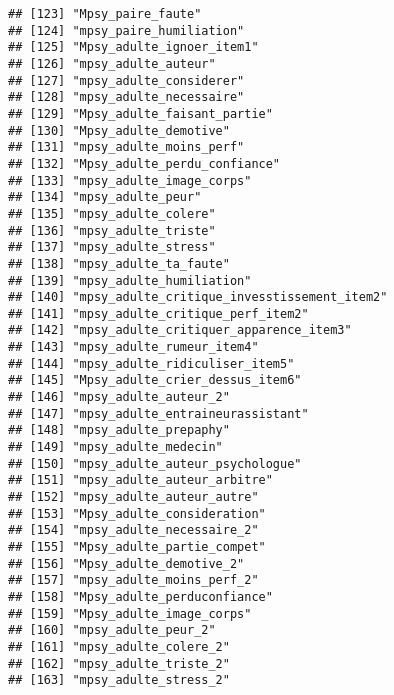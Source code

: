 \documentclass[
]{article}
\begin{document}
\begin{verbatim}
## [123] "Mpsy_paire_faute"                                    
## [124] "mpsy_paire_humiliation"                              
## [125] "Mpsy_adulte_ignoer_item1"                            
## [126] "mpsy_adulte_auteur"                                  
## [127] "mpsy_adulte_considerer"                              
## [128] "mpsy_adulte_necessaire"                              
## [129] "Mpsy_adulte_faisant_partie"                          
## [130] "Mpsy_adulte_demotive"                                
## [131] "mpsy_adulte_moins_perf"                              
## [132] "Mpsy_adulte_perdu_confiance"                         
## [133] "mpsy_adulte_image_corps"                             
## [134] "mpsy_adulte_peur"                                    
## [135] "mpsy_adulte_colere"                                  
## [136] "mpsy_adulte_triste"                                  
## [137] "mpsy_adulte_stress"                                  
## [138] "mpsy_adulte_ta_faute"                                
## [139] "mpsy_adulte_humiliation"                             
## [140] "mpsy_adulte_critique_invesstissement_item2"          
## [141] "mpsy_adulte_critique_perf_item2"                     
## [142] "mpsy_adulte_critiquer_apparence_item3"               
## [143] "mpsy_adulte_rumeur_item4"                            
## [144] "mpsy_adulte_ridiculiser_item5"                       
## [145] "Mpsy_adulte_crier_dessus_item6"                      
## [146] "mpsy_adulte_auteur_2"                                
## [147] "mpsy_adulte_entraineurassistant"                     
## [148] "mpsy_adulte_prepaphy"                                
## [149] "mpsy_adulte_medecin"                                 
## [150] "mpsy_adulte_auteur_psychologue"                      
## [151] "mpsy_adulte_auteur_arbitre"                          
## [152] "mpsy_adulte_auteur_autre"                            
## [153] "Mpsy_adulte_consideration"                           
## [154] "mpsy_adulte_necessaire_2"                            
## [155] "Mpsy_adulte_partie_compet"                           
## [156] "Mpsy_adulte_demotive_2"                              
## [157] "mpsy_adulte_moins_perf_2"                            
## [158] "Mpsy_adulte_perduconfiance"                          
## [159] "Mpsy_adulte_image_corps"                             
## [160] "mpsy_adulte_peur_2"                                  
## [161] "mpsy_adulte_colere_2"                                
## [162] "mpsy_adulte_triste_2"                                
## [163] "mpsy_adulte_stress_2"                                

\end{verbatim}
\end{document}
